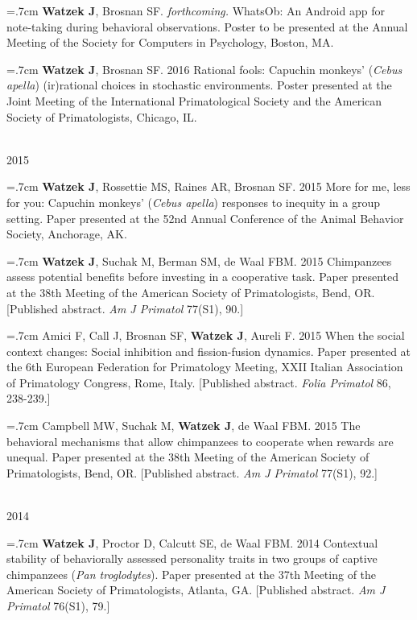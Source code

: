 \documentclass[]{friggeri-cv}
\begin{document}
\hangindent=.7cm \textbf{Watzek J}, Brosnan SF. \emph{forthcoming.} WhatsOb: An Android app for note-taking during behavioral observations. Poster to be presented at the Annual Meeting of the Society for Computers in Psychology, Boston, MA.

\hangindent=.7cm \textbf{Watzek J}, Brosnan SF. 2016 Rational fools: Capuchin monkeys' (\emph{Cebus apella}) (ir)rational choices in stochastic environments. Poster presented at the Joint Meeting of the International Primatological Society and the American Society of Primatologists, Chicago, IL.



{\large{} ~\\[-.15cm] 2015}

\hangindent=.7cm \textbf{Watzek J}, Rossettie MS, Raines AR, Brosnan SF. 2015 More for me, less for you: Capuchin monkeys' (\emph{Cebus apella}) responses to inequity in a group setting. Paper presented at the 52nd Annual Conference of the Animal Behavior Society, Anchorage, AK.

\hangindent=.7cm \textbf{Watzek J}, Suchak M, Berman SM, de Waal FBM. 2015 Chimpanzees assess potential benefits before investing in a cooperative task. Paper presented at the 38th Meeting of the American Society of Primatologists, Bend, OR. [Published abstract. \emph{Am J Primatol} 77(S1), 90.]

\hangindent=.7cm Amici F, Call J, Brosnan SF, \textbf{Watzek J}, Aureli F. 2015 When the social context changes: Social inhibition and fission-fusion dynamics. Paper presented at the 6th European Federation for Primatology Meeting, XXII Italian Association of Primatology Congress, Rome, Italy. [Published abstract. \emph{Folia Primatol} 86, 238-239.]

\hangindent=.7cm Campbell MW, Suchak M, \textbf{Watzek J}, de Waal FBM. 2015 The behavioral mechanisms that allow chimpanzees to cooperate when rewards are unequal. Paper presented at the 38th Meeting of the American Society of Primatologists, Bend, OR. [Published abstract. \emph{Am J Primatol} 77(S1), 92.]


{\large{} ~\\[-.15cm] 2014}

\hangindent=.7cm \textbf{Watzek J}, Proctor D, Calcutt SE, de Waal FBM. 2014 Contextual stability of behaviorally assessed personality traits in two groups of captive chimpanzees (\emph{Pan troglodytes}). Paper presented at the 37th Meeting of the American Society of Primatologists, Atlanta, GA. [Published abstract. \emph{Am J Primatol} 76(S1), 79.]
\end{document}

